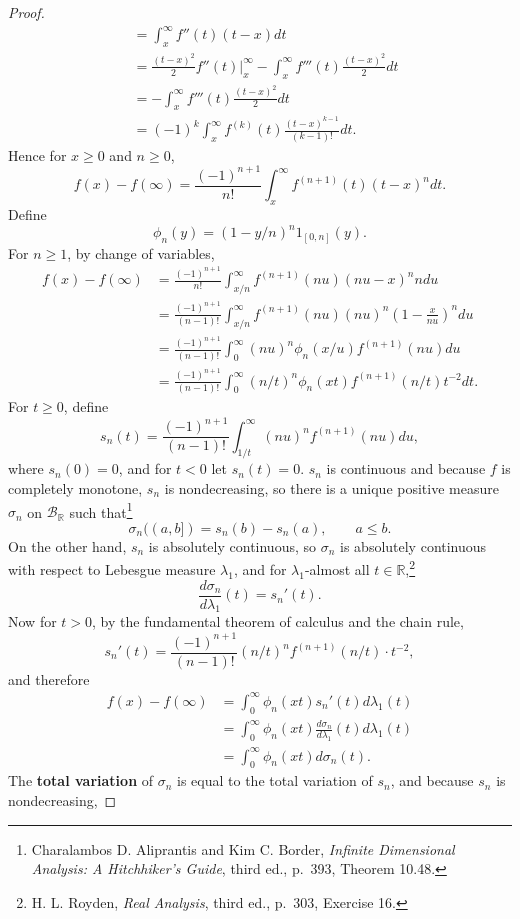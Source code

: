 \documentclass{article}
\theoremstyle{definition}
\begin{document}
\begin{proof}
\begin{align*}
&=\int_x^\infty f''(t) (t-x) dt\\
&=\frac{(t-x)^2}{2} f''(t) \Big|_x^\infty - \int_x^\infty f'''(t) \frac{(t-x)^2}{2} dt\\
&=- \int_x^\infty f'''(t) \frac{(t-x)^2}{2} dt\\
&=(-1)^k \int_x^\infty f^{(k)}(t) \frac{(t-x)^{k-1}}{(k-1)!} dt.
\end{align*}
Hence for $x \geq 0$ and $n \geq 0$, 
\[
f(x)-f(\infty) = \frac{(-1)^{n+1}}{n!} \int_x^\infty f^{(n+1)}(t) (t-x)^n dt.
\]
Define
\[
\phi_n(y) = (1-y/n)^n 1_{[0,n]}(y).
\]
For $n \geq 1$,
by change of variables,
\begin{align*}
f(x)-f(\infty)&=\frac{(-1)^{n+1}}{n!} \int_{x/n}^\infty f^{(n+1)}(nu) (nu-x)^n ndu\\
&=\frac{(-1)^{n+1}}{(n-1)!} \int_{x/n}^\infty f^{(n+1)}(nu) (nu)^n \left(1-\frac{x}{nu}\right)^n du\\
&=\frac{(-1)^{n+1}}{(n-1)!} \int_0^\infty (nu)^n \phi_n(x/u) f^{(n+1)}(nu)  du\\
&=\frac{(-1)^{n+1}}{(n-1)!} \int_0^\infty (n/t)^n \phi_n(xt) f^{(n+1)}(n/t) t^{-2}dt.
\end{align*}
For $t \geq 0$, define
\[
s_n(t) = \frac{(-1)^{n+1}}{(n-1)!} \int_{1/t}^\infty  (nu)^n f^{(n+1)}(nu) du,
\]
where $s_n(0)=0$, 
and for $t<0$ let $s_n(t)=0$. $s_n$ is continuous
and because $f$ is completely monotone, $s_n$ is nondecreasing, so there is a unique positive
measure $\sigma_n$ on $\mathscr{B}_{\mathbb{R}}$ such that\footnote{Charalambos D. Aliprantis
and Kim C. Border, {\em Infinite Dimensional Analysis: A Hitchhiker's Guide}, third ed., p.~393, Theorem 10.48.}
\[
\sigma_n((a,b])=s_n(b)-s_n(a),\qquad a \leq b.
\]
On the other hand, $s_n$ is absolutely continuous, so $\sigma_n$ is absolutely continuous with respect to
Lebesgue measure $\lambda_1$, and for $\lambda_1$-almost all $t \in \mathbb{R}$,\footnote{H. L. Royden, {\em Real Analysis},
third ed., p.~303, Exercise 16.}
\[
\frac{d\sigma_n}{d\lambda_1}(t) = s_n'(t).
\]
Now for $t>0$, by the fundamental theorem of calculus and the chain
rule,
\[
s_n'(t) = \frac{(-1)^{n+1}}{(n-1)!} (n/t)^n f^{(n+1)}(n/t) \cdot t^{-2},
\]
and therefore
\begin{align*}
f(x)-f(\infty)&=\int_0^\infty \phi_n(xt) s_n'(t) d\lambda_1(t)\\
&=\int_0^\infty \phi_n(xt) \frac{d\sigma_n}{d\lambda_1}(t) d\lambda_1(t)\\
&=\int_0^\infty \phi_n(xt) d\sigma_n(t).
\end{align*}
The \textbf{total variation} of $\sigma_n$ is equal to the total variation of $s_n$, and because $s_n$ is nondecreasing,

\end{proof}
\end{document}
